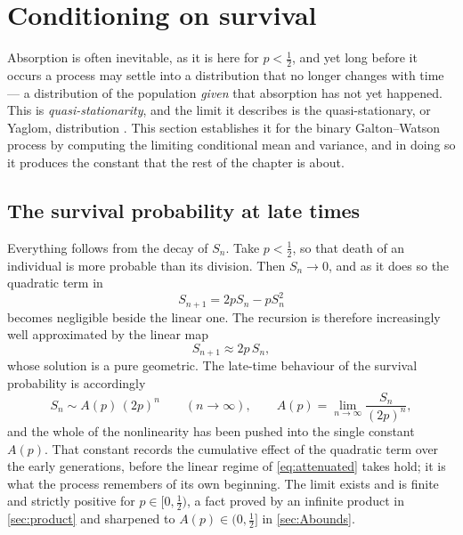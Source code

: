\section{Conditioning on survival}
\label{sec:qsd}

Absorption is often inevitable, as it is here for $p<\tfrac12$, and yet long before it
occurs a process may settle into a distribution that no longer changes with time --- a
distribution of the population \emph{given} that absorption has not yet happened. This
is \emph{quasi-stationarity}, and the limit it describes is the quasi-stationary, or
Yaglom, distribution \cite{Yaglom1947,Athreya1972}. This section establishes it for the
binary Galton--Watson process by computing the limiting conditional mean and variance,
and in doing so it produces the constant that the rest of the chapter is about.

\subsection{The survival probability at late times}
\label{sec:lateS}

Everything follows from the decay of $S_n$. Take $p<\tfrac12$, so that death of an
individual is more probable than its division. Then $S_n\to0$, and as it does so the
quadratic term in
\begin{equation*}
S_{n+1} = 2pS_n - pS_n^2
\end{equation*}
becomes negligible beside the linear one. The recursion is therefore increasingly well
approximated by the linear map
\begin{equation}
\label{eq:attenuated}
S_{n+1} \approx 2p\,S_n,
\end{equation}
whose solution is a pure geometric. The late-time behaviour of the survival probability
is accordingly
\begin{equation}
\label{eq:lateS}
S_n \sim A(p)\,(2p)^n \qquad(n\to\infty),
\qquad
A(p) = \lim_{n\to\infty}\frac{S_n}{(2p)^n},
\end{equation}
and the whole of the nonlinearity has been pushed into the single constant $A(p)$. That
constant records the cumulative effect of the quadratic term over the early generations,
before the linear regime of \cref{eq:attenuated} takes hold; it is what the process
remembers of its own beginning. The limit exists and is finite and strictly positive for
$p\in[0,\tfrac12)$, a fact proved by an infinite product in \cref{sec:product} and
sharpened to $A(p)\in(0,\tfrac12]$ in \cref{sec:Abounds}.

